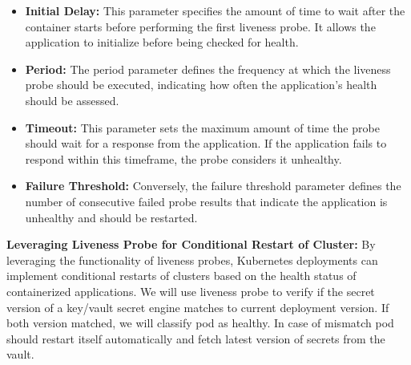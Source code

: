 \begin{itemize}
    \item \textbf{Initial Delay:} This parameter specifies the amount of time to wait after the container starts before performing the first liveness probe. It allows the application to initialize before being checked for health. \cite{kubernetes-probes}
    
    \item \textbf{Period:} The period parameter defines the frequency at which the liveness probe should be executed, indicating how often the application's health should be assessed.\cite{kubernetes-probes}
    
    \item \textbf{Timeout:} This parameter sets the maximum amount of time the probe should wait for a response from the application. If the application fails to respond within this timeframe, the probe considers it unhealthy.\cite{kubernetes-probes}
    
    \item \textbf{Failure Threshold:} Conversely, the failure threshold parameter defines the number of consecutive failed probe results that indicate the application is unhealthy and should be restarted.\cite{kubernetes-probes}
\end{itemize}

\textbf{Leveraging Liveness Probe for Conditional Restart of Cluster:}
By leveraging the functionality of liveness probes, Kubernetes deployments can implement conditional restarts of clusters based on the health status of containerized applications. We will use liveness probe to verify if the secret version of a key/vault secret engine matches to current deployment version. If both version matched, we will classify pod as healthy. In case of mismatch pod should restart itself automatically and fetch latest version of secrets from the vault. 
